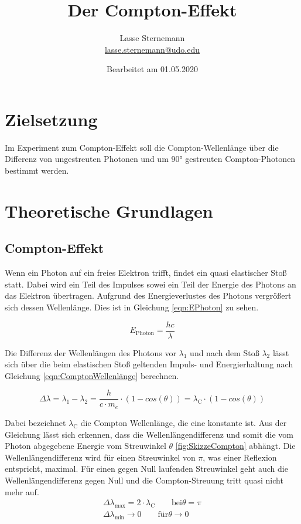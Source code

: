 \documentclass[titlepage = firstcover]{scrartcl}
\title{Der Compton-Effekt}
\author{
  Lasse Sternemann\\
  \href{mailto:lasse.sternemann@udo.edu}{lasse.sternemann@udo.edu}
}
\date{Bearbeitet am 01.05.2020}
\begin{document}
    \maketitle
    \newpage
    \tableofcontents
    \newpage
     
    \section{Zielsetzung}
    Im Experiment zum Compton-Effekt soll die Compton-Wellenlänge über die Differenz von ungestreuten Photonen und um 90° gestreuten Compton-Photonen
    bestimmt werden. 


    \section{Theoretische Grundlagen}
        \subsection{Compton-Effekt}
        Wenn ein Photon auf ein freies Elektron trifft, findet ein quasi elastischer Stoß statt. Dabei wird ein Teil des Impulses sowei ein Teil der 
        Energie des Photons an das Elektron übertragen. Aufgrund des Energieverlustes des Photons vergrößert sich dessen Wellenlänge. Dies ist in 
        Gleichung \ref{eqn:EPhoton} zu sehen.

        \begin{equation}
            E_{\text{Photon}} = \frac{hc}{\lambda}
            \label{eqn:EPhoton}
        \end{equation}
        \noindent

        Die Differenz der Wellenlängen des Photons vor $\lambda _1$ und nach dem Stoß $\lambda _2$ lässt sich über die beim elastischen Stoß geltenden
        Impuls- und Energierhaltung nach Gleichung \ref{eqn:ComptonWellenlänge} berechnen.

        \begin{equation}
            \Delta \lambda = \lambda_1 - \lambda_2 = \frac{h}{c \cdot m_e} \cdot \left(1-cos(\theta)\right) = \lambda_{\text{C}} \cdot \left(1-cos(\theta)\right)
            \label{eqn:ComptonWellenlänge}
        \end{equation}
        \noindent

        Dabei bezeichnet $\lambda_{\text{C}}$ die Compton Wellenlänge, die eine konstante ist. Aus der Gleichung lässt sich erkennen, dass die 
        Wellenlängendifferenz und somit die vom Photon abgegebene Energie vom Streuwinkel $\theta$ \ref{fig:SkizzeCompton} abhängt. Die Wellenlängendifferenz 
        wird für einen Streuwinkel von $\pi$, was einer Reflexion entspricht, maximal. Für einen gegen Null laufenden Streuwinkel geht auch die 
        Wellenlängendifferenz gegen Null und die Compton-Streuung tritt quasi nicht mehr auf.
        \begin{align}
            \Delta \lambda_{\text{max}} = 2 \cdot \lambda_{\text{C}} \qquad \text{bei} \theta = \pi \\
            \Delta \lambda_{\text{min}} \longrightarrow 0 \qquad \text{für} \theta \longrightarrow 0
        \end{align}
        \noindent
\end{document}
